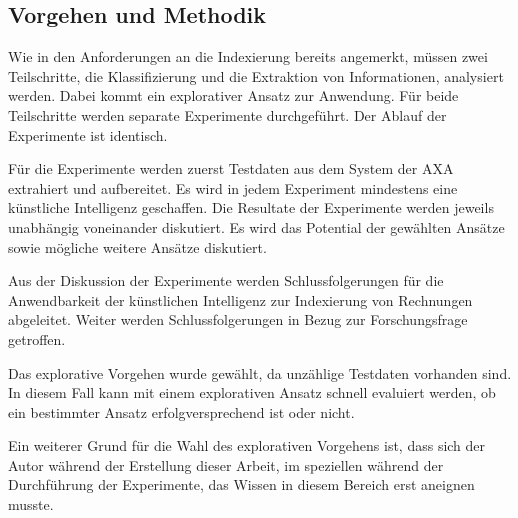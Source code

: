 \subsection{Vorgehen und Methodik}
\label{chap:vorgehen}

Wie in den Anforderungen an die Indexierung bereits angemerkt, müssen zwei Teilschritte, die Klassifizierung und die Extraktion von Informationen, analysiert werden. Dabei kommt ein explorativer Ansatz zur Anwendung. Für beide Teilschritte werden separate Experimente durchgeführt. Der Ablauf der Experimente ist identisch. 

Für die Experimente werden zuerst Testdaten aus dem System der AXA extrahiert und aufbereitet. Es wird in jedem Experiment mindestens eine künstliche Intelligenz geschaffen. Die Resultate der Experimente werden jeweils unabhängig voneinander diskutiert. Es wird das Potential der gewählten Ansätze sowie mögliche weitere Ansätze diskutiert.

Aus der Diskussion der Experimente werden Schlussfolgerungen für die Anwendbarkeit der künstlichen Intelligenz zur Indexierung von Rechnungen abgeleitet. Weiter werden Schlussfolgerungen in Bezug zur Forschungsfrage getroffen.

Das explorative Vorgehen wurde gewählt, da unzählige Testdaten vorhanden sind. In diesem Fall kann mit einem explorativen Ansatz schnell evaluiert werden, ob ein bestimmter Ansatz erfolgversprechend ist oder nicht.

Ein weiterer Grund für die Wahl des explorativen Vorgehens ist, dass sich der Autor während der Erstellung dieser Arbeit, im speziellen während der Durchführung der Experimente, das Wissen in diesem Bereich erst aneignen musste.




